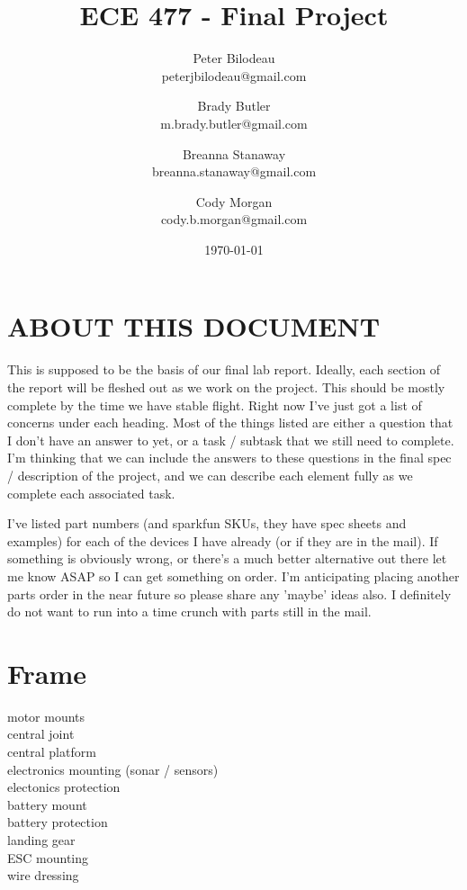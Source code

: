 \documentclass{article}
\begin{document}
\title{ECE 477 - Final Project}
\author{Peter Bilodeau\\
	peterjbilodeau@gmail.com\and
	Brady Butler\\
	m.brady.butler@gmail.com \and
	Breanna Stanaway\\
	breanna.stanaway@gmail.com\and
	Cody Morgan\\
	cody.b.morgan@gmail.com}
\date{\today}
\maketitle{}
\section{ABOUT THIS DOCUMENT}
This is supposed to be the basis of our final lab report.  Ideally, each section of the report will be fleshed out as we work on the project.  This should be mostly complete by the time we have stable flight.  Right now I've just got a list of concerns under each heading.  Most of the things listed are either a question that I don't have an answer to yet, or a task / subtask that we still need to complete.  I'm thinking that we can include the answers to these questions in the final spec / description of the project, and we can describe each element fully as we complete each associated task.

I've listed part numbers (and sparkfun SKUs, they have spec sheets and examples) for each of the devices I have already (or if they are in the mail).  If something is obviously wrong, or there's a much better alternative out there let me know ASAP so I can get something on order.  I'm anticipating placing another parts order in the near future so please share any 'maybe' ideas also.  I definitely do not want to run into a time crunch with parts still in the mail.

\section{Frame}
motor mounts\\
central joint\\
central platform\\
electronics mounting (sonar / sensors)\\
electonics protection\\
battery mount\\
battery protection\\
landing gear\\
ESC mounting\\
wire dressing\\
\end{document}
